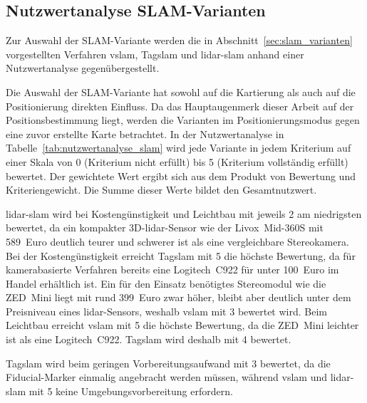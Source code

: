 \subsection*{Nutzwertanalyse SLAM-Varianten}
Zur Auswahl der SLAM-Variante werden die in Abschnitt~\ref{sec:slam_varianten} vorgestellten Verfahren \gls{vslam}, Tag\gls{slam} und \gls{lidar}-\gls{slam} 
anhand einer Nutzwertanalyse gegenübergestellt.

Die Auswahl der SLAM-Variante hat sowohl auf die Kartierung als auch auf die Positionierung direkten Einfluss.
Da das Hauptaugenmerk dieser Arbeit auf der Positionsbestimmung liegt, werden die Varianten im Positionierungsmodus gegen eine zuvor erstellte Karte betrachtet.
In der Nutzwertanalyse in Tabelle~\ref{tab:nutzwertanalyse_slam} wird jede Variante in jedem Kriterium auf einer Skala von 0 (Kriterium nicht erfüllt) 
bis 5 (Kriterium vollständig erfüllt) bewertet.
Der gewichtete Wert ergibt sich aus dem Produkt von Bewertung und Kriteriengewicht. 
Die Summe dieser Werte bildet den Gesamtnutzwert.


\gls{lidar}-\gls{slam} wird bei Kostengünstigkeit und Leichtbau mit jeweils 2 am niedrigsten bewertet, da ein kompakter 3D-\gls{lidar}-Sensor 
wie der Livox~Mid-360S mit 589~Euro deutlich teurer und schwerer ist als eine vergleichbare Stereokamera.
Bei der Kostengünstigkeit erreicht Tag\gls{slam} mit 5 die höchste Bewertung, da für kamerabasierte Verfahren bereits eine Logitech~C922 für unter 100~Euro im Handel erhältlich ist.
Ein für den Einsatz benötigtes Stereomodul wie die ZED~Mini liegt mit rund 399~Euro zwar höher, bleibt aber deutlich unter dem Preisniveau eines \gls{lidar}-Sensors, weshalb \gls{vslam} mit 3 bewertet wird.
Beim Leichtbau erreicht \gls{vslam} mit 5 die höchste Bewertung, da die ZED~Mini leichter ist als eine Logitech~C922.
Tag\gls{slam} wird deshalb mit 4 bewertet.~\cite{livox_mid360s,logitech_c922,zed_mini}

Tag\gls{slam} wird beim geringen Vorbereitungsaufwand mit 3 bewertet, da die Fiducial-Marker einmalig angebracht werden müssen, 
während \gls{vslam} und \gls{lidar}-\gls{slam} mit 5 keine Umgebungsvorbereitung erfordern.

